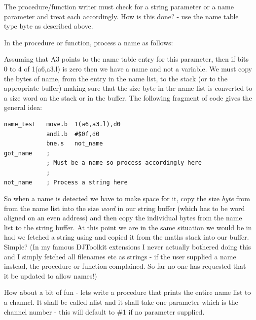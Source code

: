 The procedure/function writer must check for a string parameter or a
    name parameter and treat each accordingly. How is this done? -{} use the
    name table type byte as described above.

In the procedure or function, process a name as follows:

Assuming that A3 points to the name table entry for this parameter,
    then if bits 0 to 4 of 1(a6,a3.l) is zero then we have a name and not a
    variable. We must copy the bytes of name, from the entry in the name list, to the stack (or to the appropriate buffer) making sure that the size byte in the name list is converted to a
    size word on the stack or in the buffer. The following fragment of code
    gives the general idea:

\begin{lstlisting}[firstnumber=1,]
name_test   move.b  1(a6,a3.l),d0
            andi.b  #$0f,d0
            bne.s   not_name
got_name    ;
            ; Must be a name so process accordingly here
            ;
not_name    ; Process a string here
\end{lstlisting}

So when a name is detected we have to make space for it, copy the
    size \emph{byte} from from the name list into the size \emph{word} in our string buffer
    (which has to be word aligned on an even address) and then copy the
    individual bytes from the name list to the string buffer. At this point we
    are in the same situation we would be in had we fetched a string using
     and copied it from the maths stack into our buffer. Simple? (In
    my famous DJToolkit extensions I never actually bothered doing this and I
    simply fetched all filenames etc as strings -{} if the user supplied a name
    instead, the procedure or function complained. So far no-{}one has
    requested that it be updated to allow names!)

How about a bit of fun -{} lets write a procedure that prints the
    entire name list to a channel. It shall be called nlist and it shall take
    one parameter which is the channel number -{} this will default to \#1 if no
    parameter supplied.

